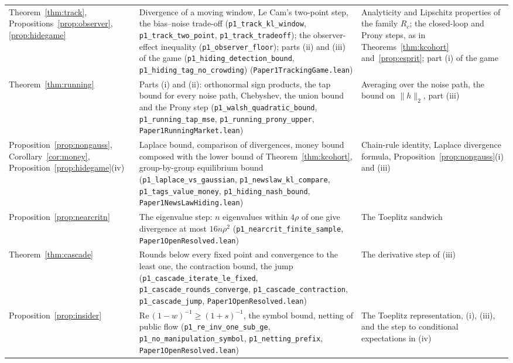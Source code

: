 \documentclass[12pt]{article}
\theoremstyle{definition}
\theoremstyle{remark}
\begin{document}
\begin{longtable}{>{\raggedright\arraybackslash}p{}>{\raggedright\arraybackslash}p{}>{\raggedright\arraybackslash}p{}}
Theorem~\ref{thm:track}, Propositions~\ref{prop:observer}, \ref{prop:hidegame} & Divergence of a moving window, Le Cam's two-point step, the bias--noise trade-off (\texttt{p1\_track\_kl\_window}, \texttt{p1\_track\_two\_point}, \texttt{p1\_track\_tradeoff}); the observer-effect inequality (\texttt{p1\_observer\_floor}); parts (ii) and (iii) of the game (\texttt{p1\_hiding\_detection\_bound}, \texttt{p1\_hiding\_tag\_no\_crowding}) (\nolinkurl{Paper1TrackingGame.lean}) & Analyticity and Lipschitz properties of the family $R_c$; the closed-loop and Prony steps, as in Theorems~\ref{thm:kcohort} and~\ref{prop:esprit}; part (i) of the game\\
Theorem~\ref{thm:running} & Parts (i) and (ii): orthonormal sign products, the tap bound for every noise path, Chebyshev, the union bound and the Prony step (\texttt{p1\_walsh\_quadratic\_bound}, \texttt{p1\_running\_tap\_mse}, \texttt{p1\_running\_prony\_upper}, \nolinkurl{Paper1RunningMarket.lean}) & Averaging over the noise path, the bound on $\|h\|_2$, part (iii)\\
Proposition~\ref{prop:nongauss}, Corollary~\ref{cor:money}, Proposition~\ref{prop:hidegame}(iv) & Laplace bound, comparison of divergences, money bound composed with the lower bound of Theorem~\ref{thm:kcohort}, group-by-group equilibrium bound (\texttt{p1\_laplace\_vs\_gaussian}, \texttt{p1\_newslaw\_kl\_compare}, \texttt{p1\_tags\_value\_money}, \texttt{p1\_hiding\_nash\_bound}, \nolinkurl{Paper1NewsLawHiding.lean}) & Chain-rule identity, Laplace divergence formula, Proposition~\ref{prop:nongauss}(i) and (iii)\\
Proposition~\ref{prop:nearcritn} & The eigenvalue step: $n$ eigenvalues within $4\rho$ of one give divergence at most $16n\rho^2$ (\texttt{p1\_nearcrit\_finite\_sample}, \nolinkurl{Paper1OpenResolved.lean}) & The Toeplitz sandwich\\
Theorem~\ref{thm:cascade} & Rounds below every fixed point and convergence to the least one, the contraction bound, the jump (\texttt{p1\_cascade\_iterate\_le\_fixed}, \texttt{p1\_cascade\_rounds\_converge}, \texttt{p1\_cascade\_contraction}, \texttt{p1\_cascade\_jump}, \nolinkurl{Paper1OpenResolved.lean}) & The derivative step of (iii)\\
Proposition~\ref{prop:insider} & $\mathrm{Re}\,(1-w)^{-1}\ge(1+s)^{-1}$, the symbol bound, netting of public flow (\texttt{p1\_re\_inv\_one\_sub\_ge}, \texttt{p1\_no\_manipulation\_symbol}, \texttt{p1\_netting\_prefix}, \nolinkurl{Paper1OpenResolved.lean}) & The Toeplitz representation, (i), (iii), and the step to conditional expectations in (iv)\\

\end{longtable}
\end{document}
